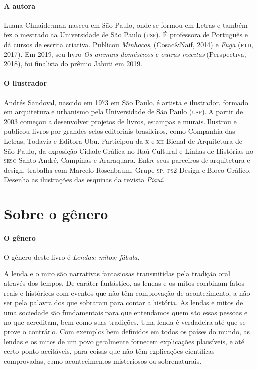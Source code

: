 \documentclass[11pt]{extarticle}
\begin{document}
\paragraph{A autora} Luana Chnaiderman nasceu em São Paulo, onde se formou em Letras e também fez o mestrado na Universidade de São Paulo (\textsc{usp}). É professora de Português e dá cursos de escrita criativa. Publicou \textit{Minhocas}, (Cosac\&Naif, 2014) e \textit{Fuga} (\textsc{ftd}, 2017). Em 2019, seu livro \textit{Os animais domésticos e outras receitas} (Perspectiva, 2018), foi finalista do prêmio Jabuti em 2019.


\paragraph{O ilustrador} Andrés Sandoval, nascido em 1973 em São Paulo, é artista e ilustrador, formado em arquitetura e urbanismo pela Universidade de São Paulo (\textsc{usp}). A partir de 2003 começou a desenvolver projetos de livros, estampas e murais. Ilustrou e publicou livros por grandes selos editoriais brasileiros, como Companhia das Letras, Todavia e Editora Ubu. Participou da \textsc{x} e \textsc{xii} Bienal de Arquitetura de São Paulo, da exposição Cidade Gráfica no Itaú Cultural e Linhas de Histórias no \textsc{sesc} Santo André, Campinas e Araraquara. Entre seus parceiros de arquitetura e design, trabalha com Marcelo Rosenbaum, Grupo \textsc{sp}, \textsc{ps2} Design e Bloco Gráfico. Desenha as ilustrações das esquinas da revista \textit{Piauí}.



\section{Sobre o gênero}

\paragraph{O gênero} O gênero deste livro é \textit{Lendas; mitos; fábula}. 

A lenda e o mito são narrativas fantasiosas transmitidas pela tradição oral através dos tempos. De caráter fantástico, as lendas e os mitos combinam fatos reais e históricos com eventos que não têm comprovação de acontecimento, a não ser pela palavra dos que sobraram para contar a história. As lendas e mitos de uma sociedade são fundamentais para que entendamos quem são essas pessoas e no que acreditam, bem como suas tradições. Uma lenda é verdadeira até que se prove o contrário. Com exemplos bem definidos em todos os países do mundo, as lendas e os mitos de um povo geralmente fornecem explicações plausíveis, e até certo ponto aceitáveis, para coisas que não têm explicações científicas comprovadas, como acontecimentos misteriosos ou sobrenaturais.
\end{document}
